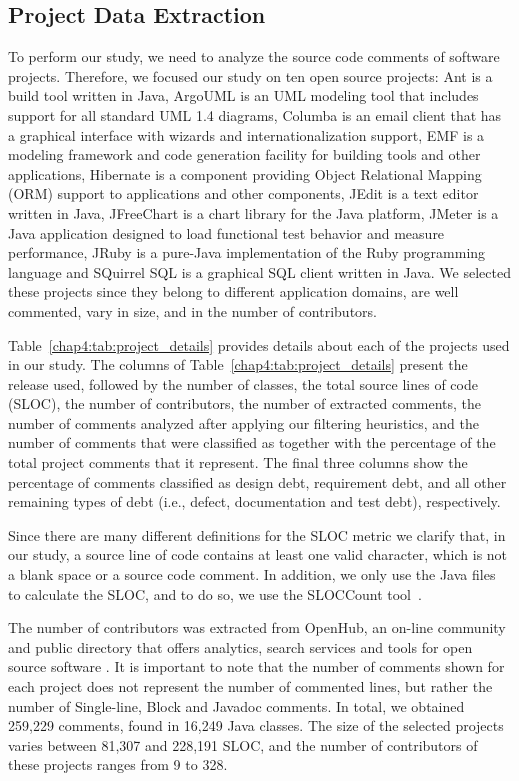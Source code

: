 \subsection{Project Data Extraction}
\label{chap4:sub:data_extraction}

To perform our study, we need to analyze the source code comments of software projects. Therefore, we focused our study on ten open source projects: Ant is a build tool written in Java, ArgoUML is an UML modeling tool that includes support for all standard UML 1.4 diagrams, Columba is an email client that has a graphical interface with wizards and internationalization support, EMF is a modeling framework and code generation facility for building tools and other applications, Hibernate is a component providing Object Relational Mapping (ORM) support to applications and other components, JEdit is a text editor written in Java, JFreeChart is a chart library for the Java platform, JMeter is a Java application designed to load functional test behavior and measure performance, JRuby is a pure-Java implementation of the Ruby programming language and SQuirrel SQL is a graphical SQL client written in Java. We selected these projects since they belong to different application domains, are well commented, vary in size, and in the number of contributors. 
    
Table~\ref{chap4:tab:project_details} provides details about each of the projects used in our study. The columns of Table~\ref{chap4:tab:project_details} present the release used, followed by the number of classes, the total source lines of code (SLOC), the number of contributors, the number of extracted comments, the number of comments analyzed after applying our filtering heuristics, and the number of comments that were classified as \SATD together with the percentage of the total project comments that it represent.
The final three columns show the percentage of \SATD comments classified as design debt, requirement debt, and all other remaining types of debt (i.e., defect, documentation and test debt), respectively. 

Since there are many different definitions for the SLOC metric we clarify that, in our study, a source line of code contains at least one valid character, which is not a blank space or a source code comment. In addition, we only use the Java files to calculate the SLOC, and to do so, we use the SLOCCount tool~\cite{wheeler2004:home}. 

The number of contributors was extracted from OpenHub, an on-line community and public directory that offers analytics, search services and tools for open source software \cite{Openhub:home}. It is important to note that the number of comments shown for each project does not represent the number of commented lines, but rather the number of Single-line, Block and Javadoc comments. In total, we obtained 259,229 comments, found in 16,249 Java classes. The size of the selected projects varies between 81,307 and 228,191 SLOC, and the number of contributors of these projects ranges from 9 to 328. 

